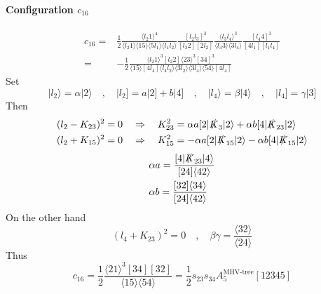 \paragraph{Configuration $c_{16}$}
\begin{equation}
\begin{split}
c_{16} = & \frac{1}{2}
\frac{\langle l_2 1 \rangle^4}{\langle l_2 1 \rangle\langle 15 \rangle\langle 5 l_1 \rangle\langle l_1 l_2\rangle}
\frac{[l_2 l_3]^3}{[l_3 2 ][2 l_2]}
\frac{\langle l_3 l_4\rangle^3}{\langle l_3 3\rangle\langle 3 l_4\rangle}
\frac{[l_4 4 ]^3}{[4l_1][l_1l_4]}
\\
= & 
-\frac{1}{2}\frac{\langle l_2 1\rangle^3[l_2 2 ]\langle 23 \rangle^3[34]^3}{\langle 15 \rangle[4l_4]\langle l_4 l_2\rangle\langle 3l_2\rangle \langle 3 l_4\rangle\langle 54\rangle[4l_4]}
\end{split}
\end{equation}
Set
\begin{equation}
|l_2\rangle = \alpha|2\rangle \quad,\quad
|l_2] = a|2] + b|4] \quad,\quad
|l_4\rangle = \beta |4\rangle \quad,\quad
|l_4] = \gamma|3]
\end{equation}
Then
\begin{equation}
\begin{split}
& (l_2 - K_{23})^2 = 0 \quad\Rightarrow\quad K_{23}^2 = \alpha a [2|\slashed{K}_3|2\rangle + \alpha b [4|\slashed{K}_{23}|2\rangle
\\
& (l_2 + K_{15})^2 = 0 \quad\Rightarrow\quad K_{15}^2 = -\alpha a [2|\slashed{K}_{15}|2\rangle - \alpha b [4|\slashed{K}_{15}|2\rangle
\end{split}
\end{equation}
\begin{equation}
\begin{split}
& \alpha a = \frac{[4|\slashed{K}_{23}|4\rangle}{[24]\langle 42\rangle}
\\
& \alpha b = \frac{[32]\langle 34\rangle}{[24]\langle 42\rangle}
\end{split}
\end{equation}
On the other hand
\begin{equation}
(l_4 + K_{23})^2 = 0 \quad,\quad \beta\gamma = \frac{\langle 32\rangle}{\langle 24\rangle}
\end{equation}
Thus
\begin{equation}
c_{16}= \frac{1}{2}\frac{\langle 21\rangle^3[34][32]}{\langle 15\rangle\langle 54\rangle} = \frac{1}{2}s_{23}s_{34}A_5^{\textrm{MHV-tree}}[12345]
\end{equation}
\fi
